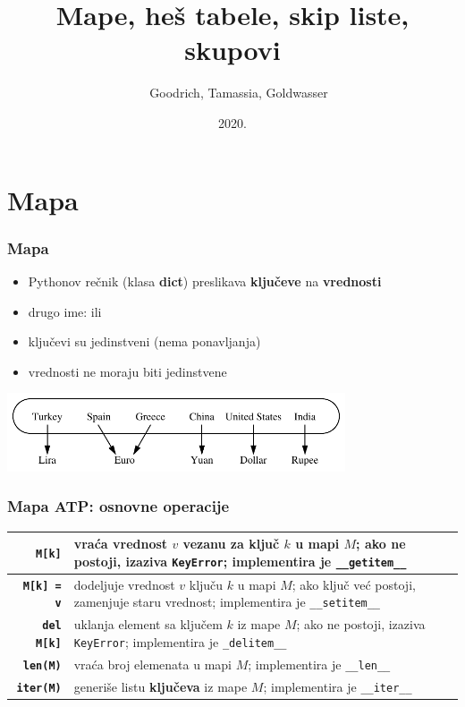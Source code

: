 \documentclass[compress,aspectratio=169]{beamer}
\title{Mape, heš tabele, skip liste, skupovi}
\author{\textcopyright \ \ Goodrich, Tamassia, Goldwasser}
\institute{Katedra za informatiku, Fakultet tehničkih nauka, Univerzitet u
Novom Sadu}
\date{2020.}
\begin{document}
\frame{\titlepage}

\section[Mapa]{Mapa}
\begin{frame}[fragile]
  \frametitle{Mapa}
  \begin{itemize}
    \item Pythonov rečnik (klasa \textbf{dict}) preslikava \textbf{ključeve} na \textbf{vrednosti} 
    \item drugo ime:  ili 
    \item ključevi su jedinstveni (nema ponavljanja)
    \item vrednosti ne moraju biti jedinstvene
  \end{itemize}
  \begin{center}
    \includegraphics[width=10cm]{asp-10-pic01.pdf}
  \end{center}
\end{frame}

\begin{frame}[fragile]
  \frametitle{Mapa ATP: osnovne operacije}
  \begin{center}
    \begin{tabular}{rp{12cm}}
      \textbf{\texttt{M[k]}} & vraća vrednost $v$ vezanu za ključ $k$ u mapi $M$; ako ne postoji, izaziva \texttt{KeyError}; implementira je \texttt{\_\_getitem\_\_} \\ \hline
      \textbf{\texttt{M[k] = v}} & dodeljuje vrednost $v$ ključu $k$ u mapi $M$; ako ključ već postoji, zamenjuje staru vrednost; implementira je \texttt{\_\_setitem\_\_} \\ \hline
      \textbf{\texttt{del M[k]}} & uklanja element sa ključem $k$ iz mape $M$; ako ne postoji, izaziva \texttt{KeyError}; implementira je \texttt{\_delitem\_\_} \\ \hline
      \textbf{\texttt{len(M)}} & vraća broj elemenata u mapi $M$; implementira je \texttt{\_\_len\_\_} \\ \hline
      \textbf{\texttt{iter(M)}} & generiše listu \textbf{ključeva} iz mape $M$;  implementira je \texttt{\_\_iter\_\_} \\
    \end{tabular}
  \end{center}
\end{frame}
\end{document}
